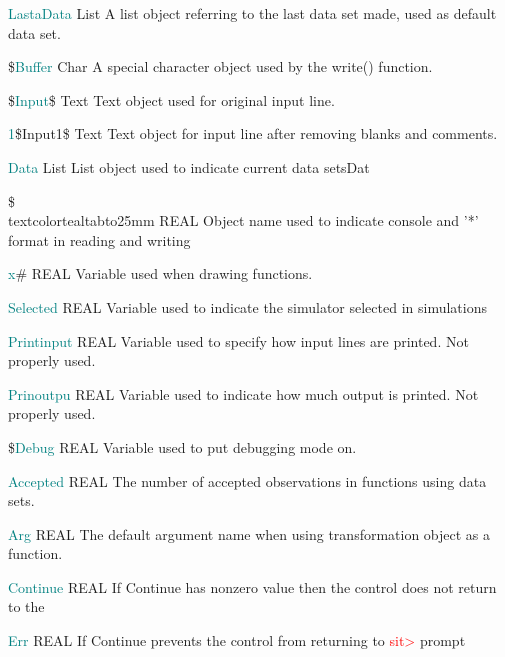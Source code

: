 \noindent \textcolor{teal}{LastaData}  \tabto{25mm }  List \tabto{45mm }  	A list object referring to the last data set made, used as default data set.

\noindent \$\textcolor{teal}{Buffer} \tabto{25mm }  Char \tabto{45mm }   A special character object used by the \textcolor{VioletRed}{write}() function.

\noindent \$\textcolor{teal}{Input}\$ \tabto{25mm }   Text  \tabto{45mm }   Text object used for original input line.

\noindent \textcolor{teal}{1}\$Input1\$  \tabto{25mm }  Text \tabto{45mm }   Text object for input line after removing blanks and comments.

\noindent \textcolor{teal}{Data}  \tabto{25mm }  List \tabto{45mm }    List object used to indicate current data setsDat

\noindent \$ \\textcolor{teal}{tabto{25mm} }  REAL \tabto{45mm }   Object name used to indicate console and '*' format in reading and writing

\noindent \textcolor{teal}{x}\# \tabto{25mm }  REAL \tabto{45mm }   Variable used when drawing functions.

\noindent \textcolor{teal}{Selected} \tabto{25mm }   REAL  \tabto{45mm }  Variable used to indicate the simulator selected in simulations

\noindent \textcolor{teal}{Printinput} \tabto{25mm }   REAL \tabto{45mm }   Variable used to specify how input lines are printed. Not properly used.

\noindent \textcolor{teal}{Prinoutpu} \tabto{25mm }   REAL \tabto{45mm }   Variable used to indicate how much output is printed. Not properly used.

\noindent \$\textcolor{teal}{Debug} \tabto{25mm }  REAL \tabto{45mm }   Variable used to put debugging mode on.

\noindent \textcolor{teal}{Accepted}  \tabto{25mm }  REAL \tabto{45mm }   The number of accepted observations in functions using data sets.

\noindent \textcolor{teal}{Arg} \tabto{25mm }   REAL  \tabto{45mm }   The default argument name when using transformation object as a function.

\noindent \textcolor{teal}{Continue}  \tabto{25mm }  REAL \tabto{45mm }   If Continue has nonzero value then the control does not return to the

\noindent \textcolor{teal}{Err} \tabto{25mm }  REAL \tabto{45mm }   If Continue prevents the control from returning to \textcolor{Red}{sit>} prompt

